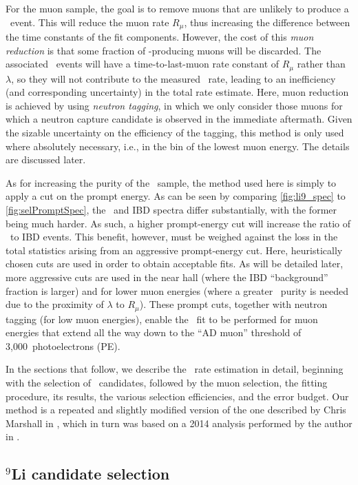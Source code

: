 \documentclass[../thesis.tex]{subfiles}
\begin{document}
For the muon sample, the goal is to remove muons that are unlikely to produce a \linine\ event. This will reduce the muon rate $R_\mu$, thus increasing the difference between the time constants of the fit components. However, the cost of this \emph{muon reduction} is that some fraction of \linine-producing muons will be discarded. The associated \linine\ events will have a time-to-last-muon rate constant of $R_\mu$ rather than $\lambda$, so they will not contribute to the measured \linine\ rate, leading to an inefficiency (and corresponding uncertainty) in the total rate estimate. Here, muon reduction is achieved by using \emph{neutron tagging}, in which we only consider those muons for which a neutron capture candidate is observed in the immediate aftermath. Given the sizable uncertainty on the efficiency of the tagging, this method is only used where absolutely necessary, i.e., in the bin of the lowest muon energy. The details are discussed later.

As for increasing the purity of the \linine\ sample, the method used here is simply to apply a cut on the prompt energy. As can be seen by comparing \autoref{fig:li9_spec} to \autoref{fig:selPromptSpec}, the \linine\ and IBD spectra differ substantially, with the former being much harder. As such, a higher prompt-energy cut will increase the ratio of \linine\ to IBD events. This benefit, however, must be weighed against the loss in the total statistics arising from an aggressive prompt-energy cut. Here, heuristically chosen cuts are used in order to obtain acceptable fits. As will be detailed later, more aggressive cuts are used in the near hall (where the IBD ``background'' fraction is larger) and for lower muon energies (where a greater \linine\ purity is needed due to the proximity of $\lambda$ to $R_\mu$). These prompt cuts, together with neutron tagging (for low muon energies), enable the \linine\ fit to be performed for muon energies that extend all the way down to the ``AD muon'' threshold of 3,000~photoelectrons (PE).

In the sections that follow, we describe the \linine\ rate estimation in detail, beginning with the selection of \linine\ candidates, followed by the muon selection, the fitting procedure, its results, the various selection efficiencies, and the error budget. Our method is a repeated and slightly modified version of the one described by Chris Marshall in \cite{ChrisLi9}, which in turn was based on a 2014 analysis performed by the author in \cite{MattLi9}.

\subsection{$^9$Li candidate selection}
\label{sec:bkgLi9Sel}
\end{document}
